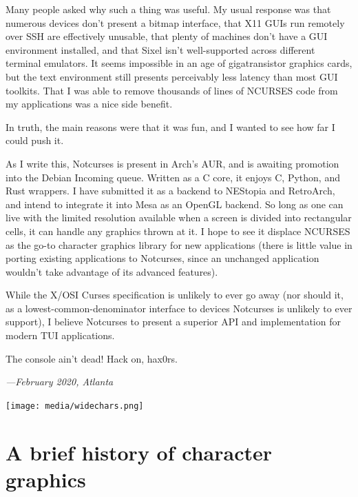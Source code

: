 \documentclass[letterpaper,10pt]{article}
\newcommand\CC{C\nolinebreak\hspace{-.05em}\raisebox{.4ex}{\relsize{-3}{\textbf{+}}}\nolinebreak\hspace{-.10em}\raisebox{.4ex}{\relsize{-3}{\textbf{+}}}\hspace{.2em}}
\begin{document}
Many people asked why such a thing was useful. My usual response was that
numerous devices don't present a bitmap interface, that X11 GUIs run remotely
over SSH are effectively unusable, that plenty of machines don't have a GUI
environment installed, and that Sixel isn't well-supported across different
terminal emulators. It seems impossible in an age of gigatransistor graphics
cards, but the text environment still presents perceivably less latency
than most GUI toolkits. That I was able to remove thousands of lines
of NCURSES code from my applications was a nice side benefit.

In truth, the main reasons were that it was fun, and I wanted to see how far
I could push it.

As I write this, Notcurses is present in Arch's AUR, and is awaiting promotion
into the Debian Incoming queue. Written as a C core, it enjoys \CC, Python, and
Rust wrappers. I have submitted it as a backend to NEStopia and RetroArch, and
intend to integrate it into Mesa as an OpenGL backend. So long as one can live
with the limited resolution available when a screen is divided into rectangular
cells, it can handle any graphics thrown at it. I hope to see it displace
NCURSES as the go-to character graphics library for new applications (there is
little value in porting existing applications to Notcurses, since an unchanged
application wouldn't take advantage of its advanced features).

While the X/OSI Curses specification is unlikely to ever go away (nor should
it, as a lowest-common-denominator interface to devices Notcurses is unlikely
to ever support), I believe Notcurses to present a superior API and
implementation for modern TUI applications.

The console ain't dead! Hack on, hax0rs.

\vspace{.5in}

\begin{flushright}
  \textit{---February 2020, Atlanta}
\end{flushright}

\vspace{1in}

\begin{center}
\texttt{[image: media/widechars.png]}
\end{center}

\newpage

\section{A brief history of character graphics}
\end{document}
